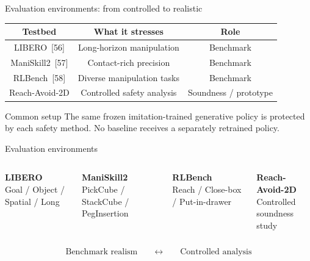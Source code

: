 \documentclass[aspectratio=169]{beamer}
\begin{document}
\begin{frame}[t,shrink=8]{Evaluation environments: from controlled to realistic}

\begin{center}

\begin{tabular}{c|c|c}
\textbf{Testbed} & \textbf{What it stresses} & \textbf{Role} \\ \hline

LIBERO~[56]
&
Long-horizon manipulation
&
Benchmark
\\[5pt]

ManiSkill2~[57]
&
Contact-rich precision
&
Benchmark
\\[5pt]

RLBench~[58]
&
Diverse manipulation tasks
&
Benchmark
\\[5pt]

Reach-Avoid-2D
&
Controlled safety analysis
&
Soundness / prototype
\end{tabular}

\end{center}

\vspace{7pt}

\begin{alertblock}{Common setup}
The same frozen imitation-trained generative policy is protected by
each safety method. No baseline receives a separately retrained policy.
\end{alertblock}

\end{frame}

\begin{frame}[t,shrink=8]{Evaluation environments}

\begin{columns}[T]

\centering
\textbf{LIBERO}\\
\small
Goal / Object / Spatial / Long

\centering
\textbf{ManiSkill2}\\
\small
PickCube / StackCube / PegInsertion

\centering
\textbf{RLBench}\\
\small
Reach / Close-box / Put-in-drawer

\centering
\textbf{Reach-Avoid-2D}\\
\small
Controlled soundness study

\end{columns}

\vspace{10pt}

\begin{center}
\Large
\[
\text{Benchmark realism}
\qquad\longleftrightarrow\qquad
\text{Controlled analysis}
\]
\end{center}

\end{frame}
\end{document}
